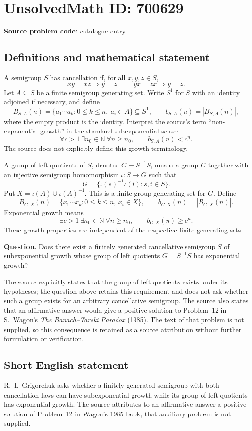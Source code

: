 \documentclass[11pt]{article}
\newcommand{\N}{\mathbb{N}}
\begin{document}
\section*{UnsolvedMath ID: 700629}
\textbf{Source problem code:} catalogue entry
\subsection{Definitions and mathematical statement}
A semigroup \(S\) has cancellation if, for all \(x,y,z\in S\),
\[
xy=xz\Longrightarrow y=z,\qquad yx=zx\Longrightarrow y=z.
\]
Let \(A\subseteq S\) be a finite semigroup generating set. Write \(S^1\) for \(S\) with an identity adjoined if necessary, and define
\[
B_{S,A}(n)=\{a_1\cdots a_k:0\leq k\leq n,\ a_i\in A\}\subseteq S^1,
\qquad b_{S,A}(n)=|B_{S,A}(n)|,
\]
where the empty product is the identity. Interpret the source's term ``non-exponential growth'' in the standard subexponential sense:
\[
\forall c>1\ \exists n_0\in\N\ \forall n\geq n_0,
\qquad b_{S,A}(n)<c^n.
\]
The source does not explicitly define this growth terminology.

A group of left quotients of \(S\), denoted \(G=S^{-1}S\), means a group \(G\) together with an injective semigroup homomorphism \(\iota:S\to G\) such that
\[
G=\{\iota(s)^{-1}\iota(t):s,t\in S\}.
\]
Put \(X=\iota(A)\cup\iota(A)^{-1}\). This is a finite group generating set for \(G\). Define
\[
B_{G,X}(n)=\{x_1\cdots x_k:0\leq k\leq n,\ x_i\in X\},
\qquad b_{G,X}(n)=|B_{G,X}(n)|.
\]
Exponential growth means
\[
\exists c>1\ \exists n_0\in\N\ \forall n\geq n_0,
\qquad b_{G,X}(n)\geq c^n.
\]
These growth properties are independent of the respective finite generating sets.

\textbf{Question.} Does there exist a finitely generated cancellative semigroup \(S\) of subexponential growth whose group of left quotients \(G=S^{-1}S\) has exponential growth?

The source explicitly states that the group of left quotients exists under its hypotheses; the question above retains this requirement and does not ask whether such a group exists for an arbitrary cancellative semigroup. The source also states that an affirmative answer would give a positive solution to Problem~12 in S.~Wagon's \emph{The Banach--Tarski Paradox} (1985). The text of that problem is not supplied, so this consequence is retained as a source attribution without further formulation or verification.
\subsection{Short English statement}
R.~I.~Grigorchuk asks whether a finitely generated semigroup with both cancellation laws can have subexponential growth while its group of left quotients has exponential growth. The source attributes to an affirmative answer a positive solution of Problem~12 in Wagon's 1985 book; that auxiliary problem is not supplied.
\end{document}
